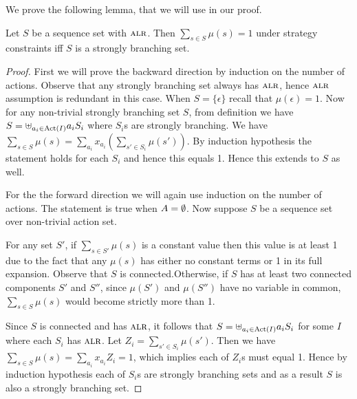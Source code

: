 We prove the following lemma, that we will use in our proof. 
\begin{lemma}\label{lem:strong-branch}
Let $S$ be a sequence set with $\textsc{alr}$. Then $\sum\limits_{s \in S}\mu(s) = 1$  under strategy constraints iff $S$ is a strongly branching set.
\end{lemma}
\begin{proof}
First we will prove the backward direction by induction on the number of actions. Observe that any strongly branching set always has $\textsc{alr}$, hence $\textsc{alr}$ assumption is redundant in this case.  When $S = \{ \epsilon \}$ recall that $\mu( \epsilon ) = 1$. Now for any non-trivial strongly branching set $S$, from definition we have $S = \uplus_{a_i \in \operatorname{Act}(I)} a_iS_i$ where $S_i$s are strongly branching. We have $\sum\limits_{s \in S}\mu(s) = \sum_{a_i} x_{a_i}(\sum\limits_{s' \in S_i}\mu(s'))$. By induction hypothesis the statement holds for each $S_i$ and hence this equals 1. Hence this extends to $S$ as well. 

For the the forward direction we will again use induction on the number of actions. The statement is true when $A = \emptyset$. Now suppose $S$ be a sequence set over non-trivial action set.

For any set $S'$, if $\sum\limits_{s \in S'}\mu(s)$ is a constant value then this value is at least 1 due to the fact that any $\mu(s)$ has either no constant terms or 1 in its full expansion.
Observe that $S$ is connected.Otherwise, if $S$ has at least two connected components $S'$ and $S''$, since $\mu(S')$ and $\mu(S'')$ have no variable in common, $\sum\limits_{s \in S}\mu(s)$ would become strictly more than 1.


 Since $S$ is connected and has $\textsc{alr}$, it follows that $S= \uplus_{a_i \in \operatorname{Act}(I)} a_iS_i $ for some $I$ where each $S_i$ has $\textsc{alr}$. Let $Z_i = \sum\limits_{s' \in S_i}\mu(s') $. Then we have $\sum\limits_{s \in S}\mu(s) = \sum_{a_i} x_{a_i}Z_i = 1$, which implies each of $Z_i$s must equal 1. Hence by induction hypothesis each of $S_i$s are strongly branching sets and as a result $S$ is also a strongly branching set. 

\end{proof}
